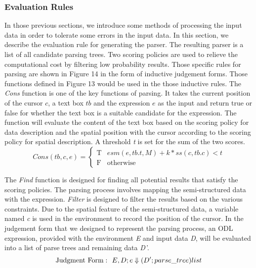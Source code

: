 \subsubsection{Evaluation Rules}

In those previous sections, we introduce some methods of processing the input data in order to tolerate some errors in the input data. In this section, we describe the evaluation rule for generating the parser. 
The resulting parser is a list of all candidate parsing trees. Two scoring 
policies are used to relieve the computational cost by filtering low probability results. Those specific rules for parsing are shown in Figure 14 in the form of inductive judgement forms. Those functions defined in Figure 13 would be used in the those inductive rules.
The {\em Cons} function is one of the key functions of parsing. It takes 
the current position of the cursor $c$, a text box $tb$ and the expression $e$ as the input 
and return true or false for whether the text box is a suitable candidate for the 
expression. The function will evaluate the content of the text box based on 
the scoring policy for data description and the spatial position 
with the cursor according to the scoring policy for spatial description. 
A threshold {\em t} is set for the sum of the two scores.
\begin{equation}
Cons(tb, c, e) = 
\begin{cases}
\text{T}& \text{$esm(e, tb.t, M)+k*ss(c, tb.c) < t$}\\
\text{F}& \text{otherwise}
\end{cases}
\label{equ:constraint}
\end{equation}

The {\em Find} function is 
designed for finding all potential results that satisfy the scoring policies. 
The parsing process involves mapping the semi-structured data with the expression. 
{\em Filter} is designed to filter the results based on the various constraints. 
Due to 
the spatial feature of the semi-structured data, 
a variable named {\em c} is used 
in the environment to record the position of the cursor.
In the judgement form that we designed to represent the parsing process, an ODL 
expression, provided with the environment {\em E} and input data {\em D}, will be 
evaluated into a list of parse trees and remaining data {\em D'}.
\[
  {\rm Judgment~ Form:}~~ E,D;e \Downarrow (D';parse\_tree)list
  \label{semantics:judegement} 
\]

